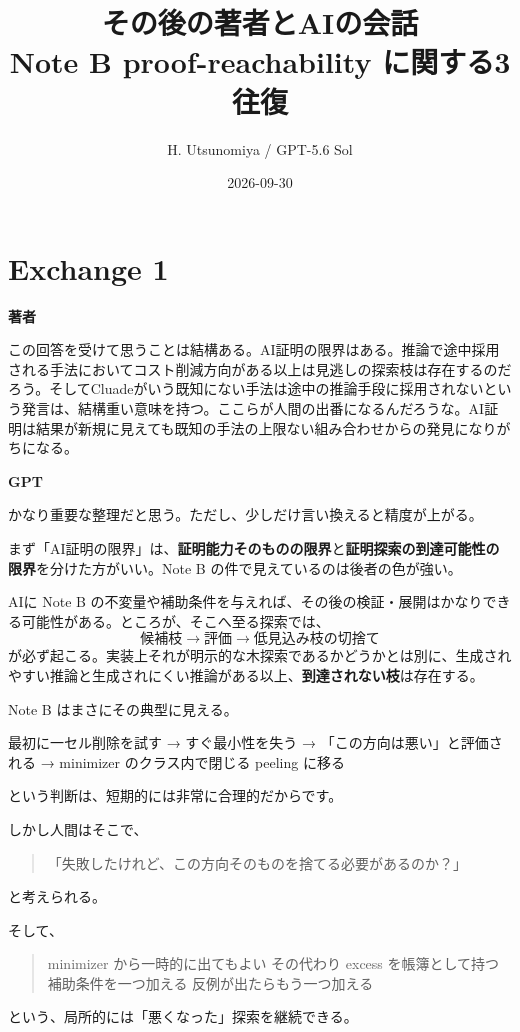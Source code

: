 \documentclass[11pt,a4paper]{article}
\title{\bfseries その後の著者とAIの会話\\[4pt]
\large Note B proof-reachability に関する3往復}
\author{H. Utsunomiya / GPT-5.6 Sol}
\date{2026-09-30}
\newcommand{\speaker}[1]{\par\medskip\noindent\textsf{\bfseries #1}\par\smallskip}
\begin{document}
\maketitle
\begin{center}
\end{center}

\section*{Exchange 1}
\speaker{著者}
この回答を受けて思うことは結構ある。AI証明の限界はある。推論で途中採用される手法においてコスト削減方向がある以上は見逃しの探索枝は存在するのだろう。そしてCluadeがいう既知にない手法は途中の推論手段に採用されないという発言は、結構重い意味を持つ。ここらが人間の出番になるんだろうな。AI証明は結果が新規に見えても既知の手法の上限ない組み合わせからの発見になりがちになる。

\speaker{GPT}
かなり重要な整理だと思う。ただし、少しだけ言い換えると精度が上がる。

まず「AI証明の限界」は、\textbf{証明能力そのものの限界}と\textbf{証明探索の到達可能性の限界}を分けた方がいい。Note B の件で見えているのは後者の色が強い。

AIに Note B の不変量や補助条件を与えれば、その後の検証・展開はかなりできる可能性がある。ところが、そこへ至る探索では、
\[
\text{候補枝}
\longrightarrow
\text{評価}
\longrightarrow
\text{低見込み枝の切捨て}
\]
が必ず起こる。実装上それが明示的な木探索であるかどうかとは別に、生成されやすい推論と生成されにくい推論がある以上、\textbf{到達されない枝}は存在する。

Note B はまさにその典型に見える。

最初に一セル削除を試す  
→ すぐ最小性を失う  
→ 「この方向は悪い」と評価される  
→ minimizer のクラス内で閉じる peeling に移る

という判断は、短期的には非常に合理的だからです。

しかし人間はそこで、
\begin{quote}
「失敗したけれど、この方向そのものを捨てる必要があるのか？」
\end{quote}
と考えられる。

そして、
\begin{quote}
minimizer から一時的に出てもよい  
その代わり excess を帳簿として持つ  
補助条件を一つ加える  
反例が出たらもう一つ加える
\end{quote}
という、局所的には「悪くなった」探索を継続できる。
\end{document}
